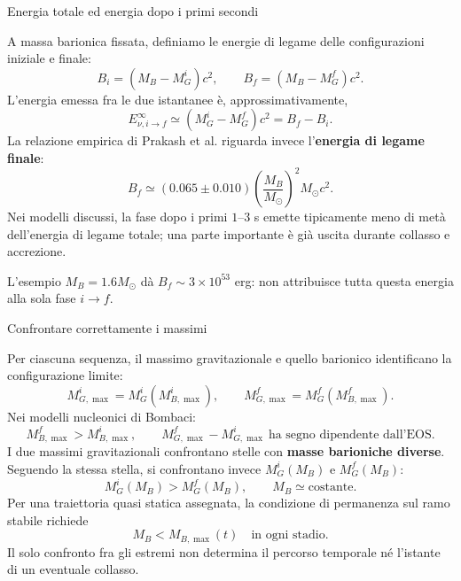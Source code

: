 \begin{frame}[t,label=pns-completa-15]{Energia totale ed energia dopo i primi secondi}
\small\raggedright
A massa barionica fissata, definiamo le energie di legame
delle configurazioni iniziale e finale:
\[
 B_i=(M_B-M_G^i)c^2,
 \qquad
 B_f=(M_B-M_G^f)c^2.
\]
L'energia emessa fra le due istantanee \`e, approssimativamente,
\[
 \boxed{E_{\nu,i\to f}^{\infty}
 \simeq(M_G^i-M_G^f)c^2=B_f-B_i}.
\]
La relazione empirica di Prakash et al. riguarda invece
l'\textbf{energia di legame finale}:
\[
 B_f\simeq(0.065\pm0.010)
 \left(\frac{M_B}{M_\odot}\right)^2M_\odot c^2.
\]
Nei modelli discussi, la fase dopo i primi $1$--$3$ s
emette tipicamente meno di met\`a dell'energia di legame totale;
una parte importante \`e gi\`a uscita durante collasso e accrezione.

\medskip
L'esempio $M_B=1.6M_\odot$ d\`a $B_f\sim3\times10^{53}$ erg:
non attribuisce tutta questa energia alla sola fase $i\to f$.

\end{frame}

\begin{frame}[t,label=pns-completa-16]{Confrontare correttamente i massimi}
\small\raggedright
Per ciascuna sequenza, il massimo gravitazionale e quello
barionico identificano la configurazione limite:
\[
 M_{G,\max}^{i}=M_G^{i}(M_{B,\max}^{i}),
 \qquad
 M_{G,\max}^{f}=M_G^{f}(M_{B,\max}^{f}).
\]
Nei modelli nucleonici di Bombaci:
\[
 \boxed{M_{B,\max}^{f}>M_{B,\max}^{i}},
 \qquad
 M_{G,\max}^{f}-M_{G,\max}^{i}
 \ \text{ha segno dipendente dall'EOS}.
\]
I due massimi gravitazionali confrontano stelle con
\textbf{masse barioniche diverse}. Seguendo la stessa stella,
si confrontano invece $M_G^i(M_B)$ e $M_G^f(M_B)$:
\[
 M_G^i(M_B)>M_G^f(M_B),
 \qquad M_B\simeq\mathrm{costante}.
\]
Per una traiettoria quasi statica assegnata, la condizione
di permanenza sul ramo stabile richiede
\[
 M_B<M_{B,\max}(t)\quad\text{in ogni stadio}.
\]
Il solo confronto fra gli estremi non determina il percorso
temporale n\'e l'istante di un eventuale collasso.

\end{frame}

